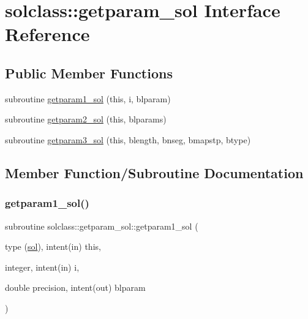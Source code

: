 \hypertarget{interfacesolclass_1_1getparam__sol}{}\section{solclass\+::getparam\+\_\+sol Interface Reference}
\label{interfacesolclass_1_1getparam__sol}
\subsection*{Public Member Functions}
\begin{DoxyCompactItemize}
\item 
subroutine \mbox{\hyperlink{interfacesolclass_1_1getparam__sol_a43eeb0d38e83ffb240dd85268b4b4e91}{getparam1\+\_\+sol}} (this, i, blparam)
\item 
subroutine \mbox{\hyperlink{interfacesolclass_1_1getparam__sol_a889ee2c360cf0e960f5387ddb2d07cdd}{getparam2\+\_\+sol}} (this, blparams)
\item 
subroutine \mbox{\hyperlink{interfacesolclass_1_1getparam__sol_af3692becfc093dfa17b0ccb2410af8e0}{getparam3\+\_\+sol}} (this, blength, bnseg, bmapstp, btype)
\end{DoxyCompactItemize}


\subsection{Member Function/\+Subroutine Documentation}
\mbox{\label{interfacesolclass_1_1getparam__sol_a43eeb0d38e83ffb240dd85268b4b4e91}} 
\subsubsection{\texorpdfstring{getparam1\_sol()}{getparam1\_sol()}}
{\footnotesize\ttfamily subroutine solclass\+::getparam\+\_\+sol\+::getparam1\+\_\+sol (\begin{DoxyParamCaption}\item[{type (\mbox{\hyperlink{namespacesolclass_structsolclass_1_1sol}{sol}}), intent(in)}]{this,  }\item[{integer, intent(in)}]{i,  }\item[{double precision, intent(out)}]{blparam }\end{DoxyParamCaption})}


